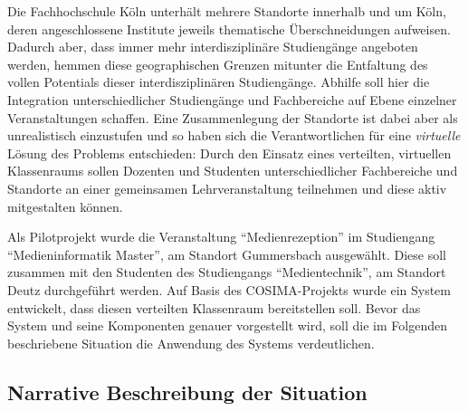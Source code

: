   Die Fachhochschule Köln unterhält mehrere Standorte innerhalb und um Köln, deren angeschlossene Institute jeweils thematische Überschneidungen aufweisen. Dadurch aber, dass immer mehr interdisziplinäre Studiengänge angeboten werden, hemmen diese geographischen Grenzen mitunter die Entfaltung des vollen Potentials dieser interdisziplinären Studiengänge. Abhilfe soll hier die Integration unterschiedlicher Studiengänge und Fachbereiche auf Ebene einzelner Veranstaltungen schaffen. Eine Zusammenlegung der Standorte ist dabei aber als unrealistisch einzustufen und so haben sich die Verantwortlichen für eine \emph{virtuelle} Lösung des Problems entschieden: Durch den Einsatz eines verteilten, virtuellen Klassenraums sollen Dozenten und Studenten unterschiedlicher Fachbereiche und Standorte an einer gemeinsamen Lehrveranstaltung teilnehmen und diese aktiv mitgestalten können.

  Als Pilotprojekt wurde die Veranstaltung "`Medienrezeption"' im Studiengang "`Medieninformatik Master"', am Standort Gummersbach ausgewählt. Diese soll zusammen mit den Studenten des Studiengangs "`Medientechnik"', am Standort Deutz durchgeführt werden. Auf Basis des COSIMA-Projekts wurde ein System entwickelt, dass diesen verteilten Klassenraum bereitstellen soll. Bevor das System und seine Komponenten genauer vorgestellt wird, soll die im Folgenden beschriebene Situation die Anwendung des Systems verdeutlichen.
  

\subsection{Narrative Beschreibung der Situation} %
\label{sub:ablaufbeschreibung}

